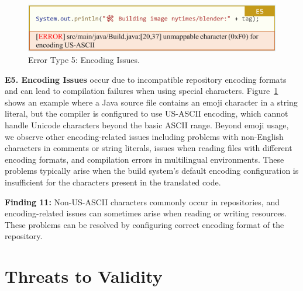 \begin{figure}
    \centering
    \includegraphics[width=\linewidth]{figures/E5.pdf}
    \caption{Error Type 5: Encoding Issues.}
    \label{fig:ErrorType5}
\end{figure}


\textbf{E5. Encoding Issues} occur due to incompatible repository encoding formats and can lead to compilation failures when using special characters. Figure~\ref{fig:ErrorType5} shows an example where a Java source file contains an emoji character in a string literal, but the compiler is configured to use US-ASCII encoding, which cannot handle Unicode characters beyond the basic ASCII range.
Beyond emoji usage, we observe other encoding-related issues including problems with non-English characters in comments or string literals, issues when reading files with different encoding formats, and compilation errors in multilingual environments. These problems typically arise when the build system's default encoding configuration is insufficient for the characters present in the translated code.

\secmargin
\begin{myboxc} \textbf{Finding 11: } %
Non-US-ASCII characters commonly occur in repositories, and encoding-related issues can sometimes arise when reading or writing resources. These problems can be resolved by configuring correct encoding format of the repository.
\end{myboxc} %
\secmargin


\section{Threats to Validity}

